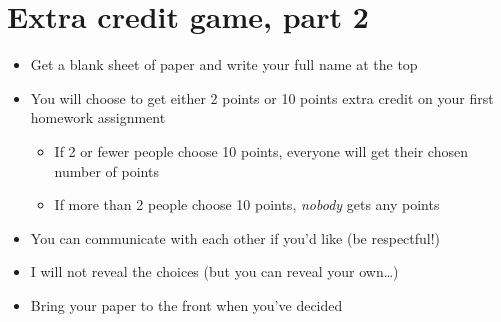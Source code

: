 \documentclass[11pt]{article}
\begin{document}
\section*{Extra credit game, part 2}
\label{sec:orga676638}
\begin{itemize}
\item Get a blank sheet of paper and write your full name at the top
\item You will choose to get either 2 points or 10 points extra credit on your first homework assignment
\begin{itemize}
\item If 2 or fewer people choose 10 points, everyone will get their chosen number of points
\item If more than 2 people choose 10 points, \emph{nobody} gets any points
\end{itemize}
\item You can communicate with each other if you'd like (be respectful!)
\item I will not reveal the choices (but you can reveal your own\ldots{})
\item Bring your paper to the front when you've decided
\end{itemize}
\end{document}

